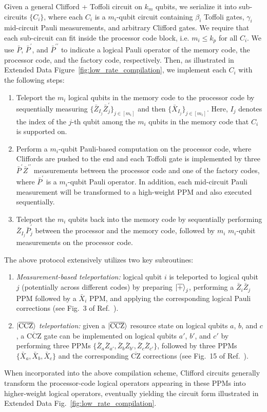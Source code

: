 \documentclass[reprint,twocolumn,secnumarabic,amssymb, aps, prx]{revtex4-2}
\newcommand{\kproc}{k_p}
\newcommand{\km}{k_m}
\newcommand{\lket}[1]{\ket{\overline{#1}}}
\newcommand{\ccz}{\ket{\overline{\text{CCZ}}}}
\begin{document}
Given a general Clifford + Toffoli circuit on $\km$ qubits, we serialize it into sub-circuits $\{C_i\}$, where each $C_i$ is a $m_i$-qubit circuit containing $\beta_i$ Toffoli gates, $\gamma_i$ mid-circuit Pauli measurements, and arbitrary Clifford gates. We require that each sub-circuit can fit inside the processor code block, i.e. $m_i \leq \kproc$ for all $C_i$. We use $\bar{P}$, $\bar{P}^{\prime}$, and $\bar{P}^{\prime\prime}$ to indicate a logical Pauli operator of the memory code, the processor code, and the factory code, respectively. Then, as illustrated in Extended Data Figure~\ref{fig:low_rate_compilation}, we implement each $C_i$ with the following steps:
\begin{enumerate}
    \item Teleport the $m_i$ logical qubits in the memory code to the processor code by sequentially measuring $\{\bar{Z}_{I_j} \bar{Z}^{\prime}_{j}\}_{j \in [m_i]}$ and then $\{\bar{X}_{I_j}\}_{j \in [m_i]}$. Here, $I_j$ denotes the index of the $j$-th qubit among the $m_i$ qubits in the memory code that $C_i$ is supported on.
    \item Perform a $m_i$-qubit Pauli-based computation on the processor code, where Cliffords are pushed to the end and each Toffoli gate is implemented by three $\bar{P}^{\prime} \bar{Z}^{\prime \prime}$ measurements between the processor code and one of the factory codes, where $\bar{P}^{\prime}$ is a $m_i$-qubit Pauli operator. In addition, each mid-circuit Pauli measurement will be transformed to a high-weight PPM and also executed sequentially.
    \item Teleport the $m_i$ qubits back into the memory code by sequentially performing $\bar{Z}_{I_j} \bar{P}_j^{\prime}$ between the processor and the memory code, followed by $m_i$ $m_i$-qubit measurements on the processor code.
\end{enumerate}
The above protocol extensively utilizes two key subroutines: 
\begin{enumerate}
    \item \textit{Measurement-based teleportation:} logical qubit $i$ is teleported to logical qubit $j$ (potentially across different codes) by preparing $\lket{+}_j$, performing a $\bar{Z}_i \bar{Z}_j$ PPM followed by a $\bar{X}_i$ PPM, and applying the corresponding logical Pauli corrections (see Fig.~3 of Ref.~\cite{poulsen2017fault}).
    \item $\ccz$ \textit{teleportation:} given a $\ccz$ resource state on logical qubits $a$, $b$, and $c$, a $\overline{\mathrm{CCZ}}$ gate can be implemented on logical qubits $a'$, $b'$, and $c'$ by performing three PPMs $\{\bar{Z}_{a}\bar{Z}_{a'}, \bar{Z}_{b}\bar{Z}_{b'}, \bar{Z}_{c}\bar{Z}_{c'}\}$, followed by three PPMs $\{\bar{X}_a, \bar{X}_b, \bar{X}_c\}$ and the corresponding $\overline{\mathrm{CZ}}$ corrections (see Fig.~15 of Ref.~\cite{litinski2022active}).
\end{enumerate}
When incorporated into the above compilation scheme, Clifford circuits generally transform the processor-code logical operators appearing in these PPMs into higher-weight logical operators, eventually yielding the circuit form illustrated in Extended Data Fig.~\ref{fig:low_rate_compilation}.
\end{document}
